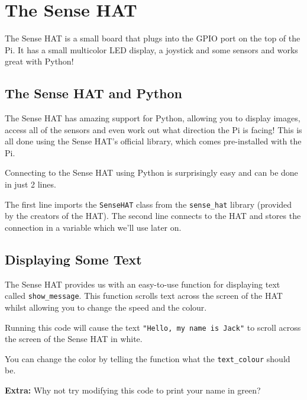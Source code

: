 \section{The Sense HAT}
	The Sense HAT is a small board that plugs into the GPIO port on the top of the Pi. It has a small multicolor LED display, a joystick and some sensors and works great with Python!

	\subsection{The Sense HAT and Python}

		The Sense HAT has amazing support for Python, allowing you to display images, access all of the sensors and even work out what direction the Pi is facing! This is all done using the Sense HAT's official library, which comes pre-installed with the Pi.

		Connecting to the Sense HAT using Python is surprisingly easy and can be done in just 2 lines.

		

		The first line imports the \texttt{SenseHAT} class from the \texttt{sense\_hat} library (provided by the creators of the HAT). The second line connects to the HAT and stores the connection in a variable which we'll use later on.

	\subsection{Displaying Some Text}

		The Sense HAT provides us with an easy-to-use function for displaying text called \texttt{show\_message}. This function scrolls text across the screen of the HAT whilst allowing you to change the speed and the colour.

		

		Running this code will cause the text \texttt{"Hello, my name is Jack"} to scroll across the screen of the Sense HAT in white.

		\newpageprint

		You can change the color by telling the function what the \texttt{text\_colour} should be.

		

		\textbf{Extra:} Why not try modifying this code to print your name in green?


